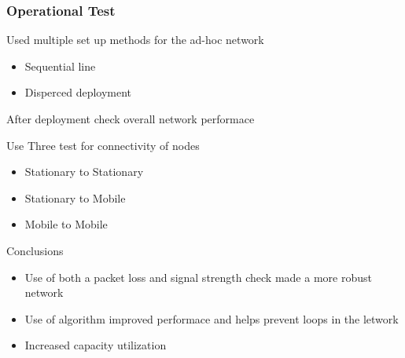 \begin{frame}[t]
  \frametitle{Operational Test}

    Used multiple set up methods for the ad-hoc network
    \begin{itemize}
      \item Sequential line
      \item Disperced deployment
    \end{itemize}
    
    After deployment check overall network performace
    \item Use Three test for connectivity of nodes
      \begin{itemize}
        \item Stationary to Stationary
        \item Stationary to Mobile
        \item Mobile to Mobile
      \end{itemize}

  \vfill
  
  Conclusions
  \begin{itemize}
  \item Use of both a packet loss and signal strength check made a more robust
    network
  \item Use of algorithm improved performace and helps prevent loops in the
    letwork
  \item Increased capacity utilization
  \end{itemize}
  
  \vfill
  
\end{frame}


